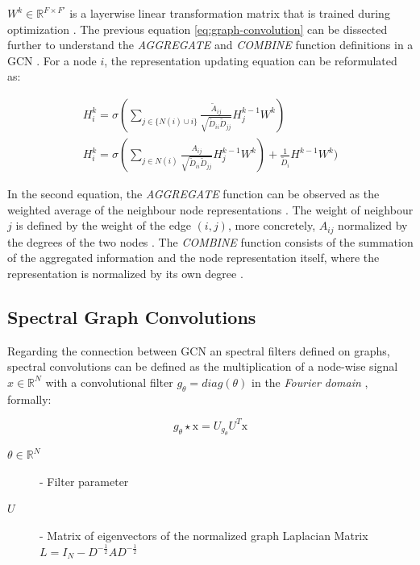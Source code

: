 $W^k \in \mathbb{R}^{F \times F'}$ is a layerwise linear transformation matrix that is trained during optimization \cite{tangGraphNeuralNetworks2022}. The previous equation \ref{eq:graph-convolution} can be dissected further to understand the \textit{AGGREGATE} and \textit{COMBINE} function definitions in a \ac{GCN} \cite{tangGraphNeuralNetworks2022}. For a node $i$, the representation updating equation can be reformulated as:

\begin{gather}
	H^k_i = \sigma(\sum_{j \in \{N(i) \cup i\}} \frac{\tilde{A}_{ij}}{\sqrt{\tilde{D}_{ii} \tilde{D}_{jj}}} H^{k-1}_j W^k) \\
	H^k_i = \sigma(\sum_{j \in N(i)} \frac{A_{ij}}{\sqrt{\tilde{D}_{ii} \tilde{D}_{jj}}} H^{k-1}_j W^k) + \frac{1}{\tilde{D}_i} H^{k-1} W^k)
\end{gather}

In the second equation, the \textit{AGGREGATE} function can be observed as the weighted average of the neighbour node representations \cite{tangGraphNeuralNetworks2022}. The weight of neighbour $j$ is defined by the weight of the edge $(i,j)$, more concretely, $A_{ij}$ normalized by the degrees of the two nodes \cite{tangGraphNeuralNetworks2022}. The \textit{COMBINE} function consists of the summation of the aggregated information and the node representation itself, where the representation is normalized by its own degree \cite{tangGraphNeuralNetworks2022}.

\subsection*{Spectral Graph Convolutions}

Regarding the connection between \ac{GCN} an spectral filters defined on graphs, spectral convolutions can be defined as the multiplication of a node-wise signal $x \in \mathbb{R}^N$ with a convolutional filter $g_\theta = diag(\theta)$ in the \textit{Fourier domain} \cite{liuIntroductionGraphNeural2020, tangGraphNeuralNetworks2022}, formally:

\begin{equation}    
	g_\theta \star \text{x} = U_{g_\theta} U^T \text{x}
\end{equation}

\begin{description}
	\item[$\theta \in \mathbb{R}^N$] - Filter parameter
	\item[$U$] - Matrix of eigenvectors of the normalized graph Laplacian Matrix $L = I_N - D^{-\frac{1}{2}} AD^{-\frac{1}{2}}$
\end{description}

